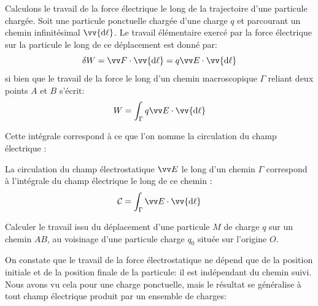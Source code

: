 \documentclass[11pt,fleqn]{book} %
\newcommand{\dd}{\mathrm{d}}
\begin{document}
Calculons le travail de la force électrique le long de la trajectoire d'une particule chargée. Soit une particule ponctuelle chargée d'une charge $q$ et parcourant un chemin infinitésimal $\vv{\dd \ell}$.  Le travail élémentaire exercé par la force électrique sur la particule le long de ce déplacement est donné par:
\begin{equation}
    \delta W = \vv F \cdot \vv{\dd \ell} = q \vv E \cdot \vv{\dd \ell}
\end{equation}
si bien que le travail de la force le long d'un chemin macroscopique $\Gamma$ reliant deux points $A$ et $B$ s'écrit:
\begin{equation}
    W = \int_\Gamma q \vv E \cdot \vv{\dd \ell}
\end{equation}

Cette intégrale correspond à ce que l'on nomme la circulation du champ électrique :

\begin{definition}
    La circulation du champ électrostatique $\vv E$ le long d'un chemin $\Gamma$ correspond à l'intégrale du champ électrique le long de ce chemin :
    \begin{equation}
        \mathcal{C} = \int_\Gamma \vv E \cdot \vv{\dd \ell}
    \end{equation}
\end{definition}

\begin{capex}
Calculer le travail issu du déplacement d'une particule $M$ de charge $q$ sur un chemin $AB$, au voisinage d'une particule charge $q_0$ située sur l'origine $O$.
\end{capex}


On constate que le travail de la force électrostatique ne dépend que de la position initiale et de la position finale de la particule: il est indépendant du chemin suivi. Nous avons vu cela pour une charge ponctuelle, mais le résultat se généralise à tout champ électrique produit par un ensemble de charges:
\end{document}
